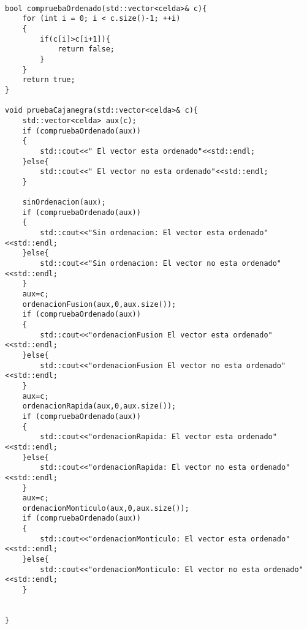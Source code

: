 \begin{lstlisting}

bool compruebaOrdenado(std::vector<celda>& c){
    for (int i = 0; i < c.size()-1; ++i)
    {
        if(c[i]>c[i+1]){
            return false;
        }
    }
    return true;
}

void pruebaCajanegra(std::vector<celda>& c){
    std::vector<celda> aux(c);
    if (compruebaOrdenado(aux))
    {
        std::cout<<" El vector esta ordenado"<<std::endl;
    }else{
        std::cout<<" El vector no esta ordenado"<<std::endl;
    }

    sinOrdenacion(aux);
    if (compruebaOrdenado(aux))
    {
        std::cout<<"Sin ordenacion: El vector esta ordenado"<<std::endl;
    }else{
        std::cout<<"Sin ordenacion: El vector no esta ordenado"<<std::endl;
    }
    aux=c;
    ordenacionFusion(aux,0,aux.size());
    if (compruebaOrdenado(aux))
    {
        std::cout<<"ordenacionFusion El vector esta ordenado"<<std::endl;
    }else{
        std::cout<<"ordenacionFusion El vector no esta ordenado"<<std::endl;
    }
    aux=c;
    ordenacionRapida(aux,0,aux.size());
    if (compruebaOrdenado(aux))
    {
        std::cout<<"ordenacionRapida: El vector esta ordenado"<<std::endl;
    }else{
        std::cout<<"ordenacionRapida: El vector no esta ordenado"<<std::endl;
    }
    aux=c;
    ordenacionMonticulo(aux,0,aux.size());
    if (compruebaOrdenado(aux))
    {
        std::cout<<"ordenacionMonticulo: El vector esta ordenado"<<std::endl;
    }else{
        std::cout<<"ordenacionMonticulo: El vector no esta ordenado"<<std::endl;
    }
    

}
\end{lstlisting}